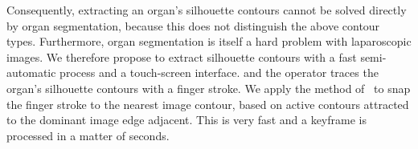 Consequently, extracting an organ's silhouette contours cannot be solved directly by organ segmentation, because this does not distinguish the above contour types. Furthermore, organ segmentation is itself a hard problem with laparoscopic images. We therefore propose to extract silhouette contours with a fast semi-automatic process and a touch-screen interface.  and the operator traces the organ's silhouette contours with a finger stroke. We apply the method of~\cite{Mortensen95intelligentscissors} to snap the finger stroke to the nearest image contour, based on active contours attracted to the dominant image edge adjacent. This is very fast and a keyframe is processed in a matter of seconds. %




